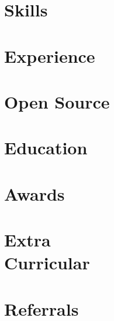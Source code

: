 \documentclass[a4paper]{resume}
\begin{document}
\def \sepspace {\vspace{1em}}
\makeheader{\contactphone}{\contactemail}{\contactwebsite}
\section{Skills}{\skillstechnical}
\section{Experience}{\experience}
\section{Open Source}{\projects}
\section{Education}{\education}
\section{Awards}{\awards}
\section{Extra\\Curricular}{\extracurricular}
\section{Referrals}{}
\end{document}
